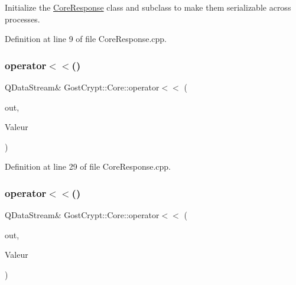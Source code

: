 Initialize the \hyperlink{struct_gost_crypt_1_1_core_1_1_core_response}{Core\+Response} class and subclass to make them serializable across processes. 



Definition at line 9 of file Core\+Response.\+cpp.

\mbox{\label{namespace_gost_crypt_1_1_core_a4a457cd0affe92605f93430290c6e538}} 
\subsubsection{\texorpdfstring{operator$<$$<$()}{operator<<()}\hspace{0.1cm}{\footnotesize\ttfamily [1/56]}}
{\footnotesize\ttfamily Q\+Data\+Stream\& Gost\+Crypt\+::\+Core\+::operator$<$$<$ (\begin{DoxyParamCaption}\item[{Q\+Data\+Stream \&}]{out,  }\item[{const \hyperlink{struct_gost_crypt_1_1_core_1_1_core_response}{Core\+Response} \&}]{Valeur }\end{DoxyParamCaption})}



Definition at line 29 of file Core\+Response.\+cpp.

\mbox{\label{namespace_gost_crypt_1_1_core_a5e3f5acf096e3b1a93c849a1b1d74919}} 
\subsubsection{\texorpdfstring{operator$<$$<$()}{operator<<()}\hspace{0.1cm}{\footnotesize\ttfamily [2/56]}}
{\footnotesize\ttfamily Q\+Data\+Stream\& Gost\+Crypt\+::\+Core\+::operator$<$$<$ (\begin{DoxyParamCaption}\item[{Q\+Data\+Stream \&}]{out,  }\item[{const \hyperlink{struct_gost_crypt_1_1_core_1_1_core_request}{Core\+Request} \&}]{Valeur }\end{DoxyParamCaption})}




